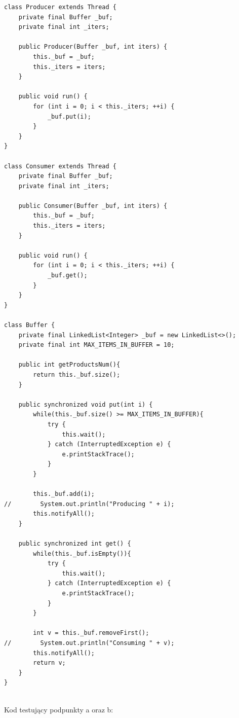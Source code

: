 \documentclass[12pt]{article}
\begin{document}
\begin{verbatim}
class Producer extends Thread {
    private final Buffer _buf;
    private final int _iters;

    public Producer(Buffer _buf, int iters) {
        this._buf = _buf;
        this._iters = iters;
    }

    public void run() {
        for (int i = 0; i < this._iters; ++i) {
            _buf.put(i);
        }
    }
}

class Consumer extends Thread {
    private final Buffer _buf;
    private final int _iters;

    public Consumer(Buffer _buf, int iters) {
        this._buf = _buf;
        this._iters = iters;
    }

    public void run() {
        for (int i = 0; i < this._iters; ++i) {
            _buf.get();
        }
    }
}

class Buffer {
    private final LinkedList<Integer> _buf = new LinkedList<>();
    private final int MAX_ITEMS_IN_BUFFER = 10;

    public int getProductsNum(){
        return this._buf.size();
    }

    public synchronized void put(int i) {
        while(this._buf.size() >= MAX_ITEMS_IN_BUFFER){
            try {
                this.wait();
            } catch (InterruptedException e) {
                e.printStackTrace();
            }
        }

        this._buf.add(i);
//        System.out.println("Producing " + i);
        this.notifyAll();
    }

    public synchronized int get() {
        while(this._buf.isEmpty()){
            try {
                this.wait();
            } catch (InterruptedException e) {
                e.printStackTrace();
            }
        }

        int v = this._buf.removeFirst();
//        System.out.println("Consuming " + v);
        this.notifyAll();
        return v;
    }
}


\end{verbatim}
\vspace{0.5cm}
Kod testujący podpunkty a oraz b:
\end{document}
